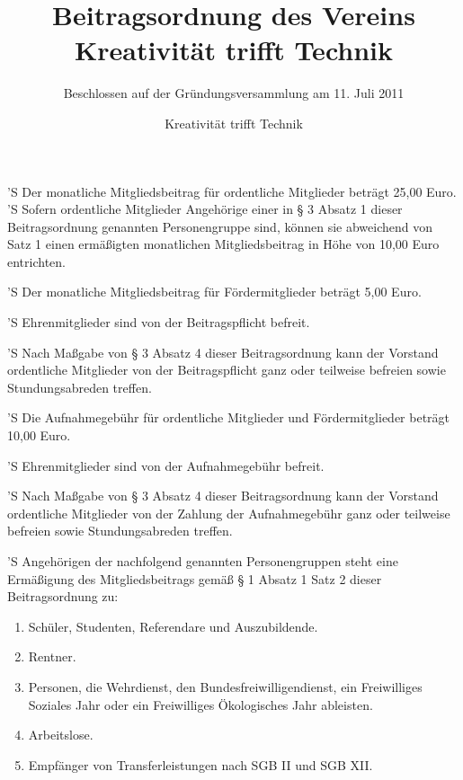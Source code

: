 \documentclass[a4paper,10pt]{scrreprt}
\begin{document}
\title{Beitragsordnung des Vereins\\Kreativität trifft Technik}
\subtitle{Beschlossen auf der Gründungsversammlung am 11. Juli 2011}
\author{Kreativität trifft Technik}



\begin{contract}


'S Der monatliche Mitgliedsbeitrag für ordentliche Mitglieder beträgt 25,00
Euro.
'S Sofern ordentliche Mitglieder Angehörige einer in § 3 Absatz 1 dieser
Beitragsordnung genannten Personengruppe sind, können sie abweichend von
Satz 1 einen ermäßigten monatlichen Mitgliedsbeitrag in Höhe von 10,00
Euro entrichten.

'S Der monatliche Mitgliedsbeitrag für Fördermitglieder beträgt 5,00 Euro.

'S Ehrenmitglieder sind von der Beitragspflicht befreit.

'S Nach Maßgabe von § 3 Absatz 4 dieser Beitragsordnung kann der Vorstand
ordentliche Mitglieder von der Beitragspflicht ganz oder teilweise befreien
sowie Stundungsabreden treffen.


'S Die Aufnahmegebühr für ordentliche Mitglieder und Fördermitglieder beträgt
10,00 Euro.

'S Ehrenmitglieder sind von der Aufnahmegebühr befreit.

'S Nach Maßgabe von § 3 Absatz 4 dieser Beitragsordnung kann der Vorstand
ordentliche Mitglieder von der Zahlung der Aufnahmegebühr ganz oder teilweise
befreien sowie Stundungsabreden treffen.


'S Angehörigen der nachfolgend genannten Personengruppen steht eine Ermäßigung
des Mitgliedsbeitrags gemäß § 1 Absatz 1 Satz 2 dieser Beitragsordnung zu:
\begin{enumerate}
	\item Schüler, Studenten, Referendare und Auszubildende.
	\item Rentner.
	\item Personen, die Wehrdienst, den Bundesfreiwilligendienst, ein
          Freiwilliges Soziales Jahr oder ein Freiwilliges Ökologisches
          Jahr ableisten.
	\item Arbeitslose.
	\item Empfänger von Transferleistungen nach SGB II und SGB XII.
\end{enumerate}


\end{contract}
\end{document}
